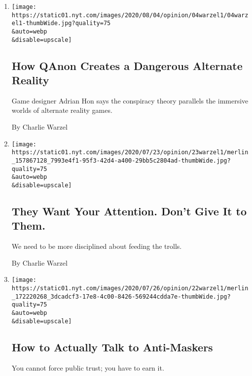 \begin{enumerate}
\def\labelenumi{\arabic{enumi}.}
\item
  \href{/2020/08/04/opinion/qanon-conspiracy-theory-arg.html}{}

  \texttt{[image: https://static01.nyt.com/images/2020/08/04/opinion/04warzel1/04warzel1-thumbWide.jpg?quality=75\\\&auto=webp\\\&disable=upscale]}

  \hypertarget{how-qanon-creates-a-dangerous-alternate-reality}{%
  \subsection{How QAnon Creates a Dangerous Alternate
  Reality}\label{how-qanon-creates-a-dangerous-alternate-reality}}

  Game designer Adrian Hon says the conspiracy theory parallels the
  immersive worlds of alternate reality games.

  By Charlie Warzel
\item
  \href{/2020/07/23/opinion/cancel-culture.html}{}

  \texttt{[image: https://static01.nyt.com/images/2020/07/23/opinion/23warzel1/merlin\_157867128\_7993e4f1-95f3-42d4-a400-29bb5c2804ad-thumbWide.jpg?quality=75\\\&auto=webp\\\&disable=upscale]}

  \hypertarget{they-want-your-attention-dont-give-it-to-them}{%
  \subsection{They Want Your Attention. Don't Give It to
  Them.}\label{they-want-your-attention-dont-give-it-to-them}}

  We need to be more disciplined about feeding the trolls.

  By Charlie Warzel
\item
  \href{/2020/07/22/opinion/coronavirus-health-experts.html}{}

  \texttt{[image: https://static01.nyt.com/images/2020/07/26/opinion/22warzel1/merlin\_172220268\_3dcadcf3-17e8-4c00-8426-569244cdda7e-thumbWide.jpg?quality=75\\\&auto=webp\\\&disable=upscale]}

  \hypertarget{how-to-actually-talk-to-anti-maskers}{%
  \subsection{How to Actually Talk to
  Anti-Maskers}\label{how-to-actually-talk-to-anti-maskers}}

  You cannot force public trust; you have to earn it.


\end{enumerate}

